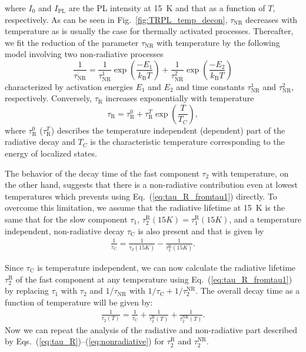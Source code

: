 \noindent where $I_0$ and $I_\mathrm{PL}$ are the PL intensity at 15~K and that as a function of $T$, respectively. As can be seen in Fig.~\ref{fig:TRPL_temp_decon}, $\tau_\mathrm{NR}$ decreases with temperature as is usually the case for thermally activated processes. Thereafter, we fit the reduction of the parameter $\tau_\mathrm{NR}$ with temperature by the following model involving two non-radiative processes 
%
\begin{equation}
\frac{1}{\tau_\mathrm{NR}}=\frac{1}{\tau_\mathrm{NR}^1}\exp{\left(\frac{-E_1}{k_\mathrm{B}T}\right)} + \frac{1}{\tau_\mathrm{NR}^2}\exp{\left(\frac{-E_2}{k_\mathrm{B}T}\right)} \label{eq:nonradiative}
\end{equation}
characterized by activation energies $E_1$ and $E_2$ and time constants $\tau_\mathrm{NR}^1$ and $\tau_\mathrm{NR}^2$, respectively.
Conversely, $\tau_\mathrm{R}$ increases exponentially with temperature
%
\begin{equation}
\tau_\mathrm{R} = \tau_\mathrm{R}^0 + \tau_\mathrm{R}^T \exp{\left(\frac{T}{T_C}\right)}, \label{eq:tau_R} 
\end{equation}
where $ \tau_\mathrm{R}^0$ ($ \tau_\mathrm{R}^T$) describes the temperature independent (dependent) part of the radiative decay and $T_C$ is the characteristic temperature corresponding to the energy of localized states. 

The behavior of the decay time of the fast component $\tau_2$ with temperature, on the other hand, suggests that there is a non-radiative contribution even at lowest temperatures which prevents using Eq.~(\ref{eq:tau_R_fromtau1}) directly. To overcome this limitation, we assume that the radiative lifetime at 15~K is the same that for the slow component $\tau_1$, $\tau_2^\mathrm{R}(15K)=\tau_1^\mathrm{R}(15K)$, and a temperature independent, non-radiative decay $\tau_\mathrm{C}$ is also present and that is given by
%
\begin{eqnarray}
\frac{1}{\tau_\mathrm{C}}=\frac{1}{\tau_2(15K)}-\frac{1}{\tau_2^\mathrm{R}(15K)}.\label{eq:tau_C}
\end{eqnarray}

Since $\tau_\mathrm{C}$ is temperature independent, we can now calculate the radiative lifetime $\tau_2^\mathrm{R}$ of the fast component at any temperature using Eq.~(\ref{eq:tau_R_fromtau1}) by replacing $\tau_1$ with $\tau_2$ and $1/\tau_\mathrm{NR}$ with $1/\tau_\mathrm{C}+1/\tau_2^\mathrm{NR}$. The overall decay time as a function of temperature will be given by:
\begin{eqnarray}
\frac{1}{\tau_2(T)}=\frac{1}{\tau_\mathrm{C}}+\frac{1}{\tau_2^\mathrm{R}(T)}+\frac{1}{\tau_2^\mathrm{NR}(T)}.
\end{eqnarray}
%
Now we can repeat the analysis of the radiative and non-radiative part described by Eqs.~(\ref{eq:tau_R})--(\ref{eq:nonradiative}) for $\tau_2^\mathrm{R}$ and $\tau_2^\mathrm{NR}$.

